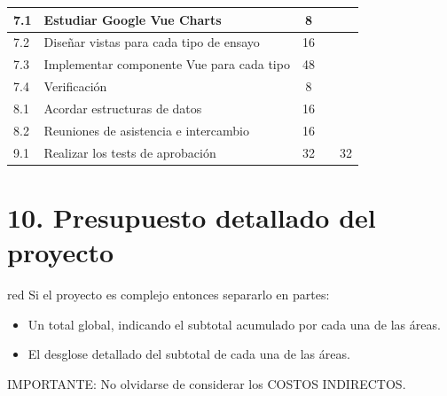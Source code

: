 \documentclass[11pt]{charter}
\begin{document}
\begin{table}[htpb]
\begin{tabular}{|l|l|c|c|c|}
7.1 & Estudiar Google Vue Charts & 8 &  &  \\ \hline
7.2 & Diseñar vistas para cada tipo de ensayo & 16 &  &  \\ \hline
7.3 & Implementar componente Vue para cada tipo & 48 &  &  \\ \hline
7.4 & Verificación & 8 &  &  \\ \hline
8.1 & Acordar estructuras de datos & 16 &  &  \\ \hline
8.2 & Reuniones de asistencia e intercambio & 16 &  &  \\ \hline
9.1 & Realizar los tests de aprobación & 32 &  & 32 \\ \hline
\end{tabular}
\end{table}


\section{10. Presupuesto detallado del proyecto}
\label{sec:presupuesto}

\begin{consigna}{red}
Si el proyecto es complejo entonces separarlo en partes:
\begin{itemize}
\item Un total global, indicando el subtotal acumulado por cada una de las áreas.
\item El desglose detallado del subtotal de cada una de las áreas.
\end{itemize}

IMPORTANTE: No olvidarse de considerar los COSTOS INDIRECTOS.

\end{consigna}
\end{document}

